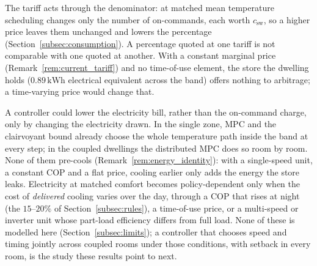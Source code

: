 \documentclass[pdflatex,sn-mathphys-num,iicol]{sn-jnl}
\theoremstyle{thmstyleone}\newtheorem{proposition}{Proposition}\newtheorem{corollary}{Corollary}
\theoremstyle{thmstyletwo}\newtheorem{remark}{Remark}\newtheorem{observation}{Observation}
\theoremstyle{thmstylethree}\newtheorem{definition}{Definition}
\newcommand{\csw}{c_{\mathrm{sw}}}
\newcommand{\kWh}{\text{kWh}}
\begin{document}
The tariff acts through the denominator: at matched mean temperature scheduling changes only the number of on-commands, each worth $\csw$, so a higher price leaves them unchanged and lowers the percentage (Section~\ref{subsec:consumption}). A percentage quoted at one tariff is not comparable with one quoted at another. With a constant marginal price (Remark~\ref{rem:current_tariff}) and no time-of-use element, the store the dwelling holds ($0.89\,\kWh$ electrical equivalent across the band) offers nothing to arbitrage; a time-varying price would change that.

A controller could lower the electricity bill, rather than the on-command charge, only by changing the electricity drawn. In the single zone, MPC and the clairvoyant bound already choose the whole temperature path inside the band at every step; in the coupled dwellings the distributed MPC does so room by room. None of them pre-cools (Remark~\ref{rem:energy_identity}): with a single-speed unit, a constant COP and a flat price, cooling earlier only adds the energy the store leaks. Electricity at matched comfort becomes policy-dependent only when the cost of \emph{delivered} cooling varies over the day, through a COP that rises at night (the $15$--$20\%$ of Section~\ref{subsec:rules}), a time-of-use price, or a multi-speed or inverter unit whose part-load efficiency differs from full load. None of these is modelled here (Section~\ref{subsec:limits}); a controller that chooses speed and timing jointly across coupled rooms under those conditions, with setback in every room, is the study these results point to next.
\end{document}
